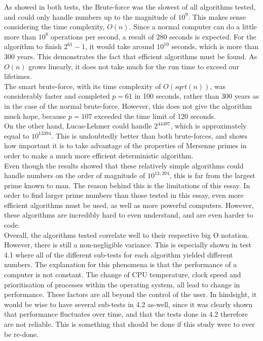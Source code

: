 \documentclass[main.tex]{subfiles}
\begin{document}

As showed in both tests, the Brute-force was the slowest of all algorithms tested, and
could only handle numbers up to the magnitude of $10^{9}$. This makes sense
considering the time complexity, $O(n)$. Since a normal computer can do a little
more than $10^{8}$ operations per second, a result of 280 seconds is expected.
For the algorithm to finish $2^{61}-1$, it would take around $10^{10}$ seconds,
which is more than 300 years. This demonstrates the fact that efficient
algorithms must be found. As $O(n)$ grows linearly, it does not take much for
the run time to exceed our lifetimes. \\

The smart brute-force, with its time complexity of $O(sqrt(n))$, was
considerably faster and completed $p=61$ in 100 seconds, rather than 300 years
as in the case of the normal brute-force. However, this does not give the
algorithm much hope, because $p=107$ exceeded the time limit of 120 seconds. \\

On the other hand, Lucas-Lehmer could handle $2^{44497}$, which is approximately
equal to $10^{13394}$. This is
undoubtedly better than both brute-forces, and shows how important it is to take
advantage of the properties of Mersenne primes in order to make a much more
efficient deterministic algorithm. \\
﻿
Even though the results showed that these relatively simple algorithms could
handle numbers on the order of magnitude of $10^{13,394}$, this is far from the
largest prime known to man. The reason behind this is the limitations of this
essay. In order to find larger prime numbers than those tested in this essay,
even more efficient algorithms must be used, as well as more powerful computers.
However, these algorithms are incredibly hard to even understand, and are even
harder to code. \\

Overall, the algorithms tested correlate well to their respective big O
notation. However, there is still a non-negligible variance. This is especially
shown in test 4.1 where all of the different sub-tests for each algorithm
yielded different numbers. The explanation for this phenomena is that the
performance of a computer is not constant. The change of CPU temperature, clock
speed and prioritisation of processes within the operating system, all lead to
change in performance. These factors are all beyond the control of the user. In
hindsight, it would be wise to have several sub-tests in 4.2 as-well, since it
was clearly shown that performance fluctuates over time, and that the tests done
in 4.2 therefore are not reliable. This is something that should be done if this
study were to ever be re-done. \\
\end{document}
